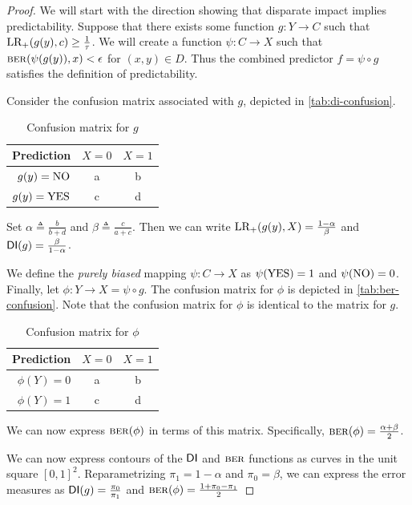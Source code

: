 \begin{proof}
We will start with the direction showing that disparate impact implies predictability.  Suppose that there exists some function $g:Y \rightarrow C$ such that $\text{LR}_+(g(y), c) \geq \frac{1}{\tau}$.  We will create a function $\psi:C \rightarrow X$ such that $\text{\textsc{ber}}(\psi(g(y)), x) < \epsilon$ for $(x,y) \in D$. Thus the combined predictor $f = \psi \circ g$ satisfies the definition of predictability. 

Consider the confusion matrix associated with $g$, depicted in \autoref{tab:di-confusion}.
\begin{table}[htbp]
  \centering
  \begin{tabular}{r|c|c}
   Prediction & $X = 0$ & $X = 1$ \\ \hline
   $g(y) = \text{NO}  $ & a       & b       \\
   $g(y) = \text{YES} $ & c       & d
  \end{tabular}
  \caption{Confusion matrix for $g$\label{tab:di-confusion}}
\end{table}
Set $\alpha \triangleq
\frac{b}{b+d}$ and $\beta\triangleq \frac{c}{a+c}$. Then we can write 
$ \text{LR}_+(g(y), X) = \frac{1-\alpha}{\beta}$ and $\mathsf{DI}(g) = \frac{\beta}{1 - \alpha}$. 

We define the \emph{purely biased} mapping $\psi \colon C \to X$ as $\psi(\text{YES}) = 1$ and $\psi(\text{NO}) = 0$. Finally, let $\phi \colon Y \to X = \psi \circ g$. The confusion matrix for $\phi$ is depicted in \autoref{tab:ber-confusion}. Note that the confusion matrix for $\phi$ is identical to the matrix for $g$. 
\begin{table}[htbp]
  \centering
  \begin{tabular}{r|c|c}
   Prediction & $X = 0$ & $X = 1$ \\ \hline
   $\phi(Y) = 0  $ & a       & b       \\
   $\phi(Y) = 1  $ & c       & d
  \end{tabular}
  \caption{Confusion matrix for $\phi$\label{tab:ber-confusion}}
\end{table}

We can now express $\text{\textsc{ber}}(\phi)$ in terms of this matrix. Specifically, 
$ \text{\textsc{ber}}(\phi) = \frac{\alpha + \beta}{2}$.

\vspace*{0.1in}
We can now express contours of the $\mathsf{DI}$ and $\text{\textsc{ber}}$ functions as curves in the unit square $[0,1]^2$. 
Reparametrizing $\pi_1 = 1 - \alpha$ and $\pi_0 = \beta$, we can express the error
measures as $  \mathsf{DI}(g) =  \frac{\pi_0}{\pi_1} $ and $ \text{\textsc{ber}}(\phi) = \frac{1 + \pi_0 - \pi_1}{2} $



\end{proof}
